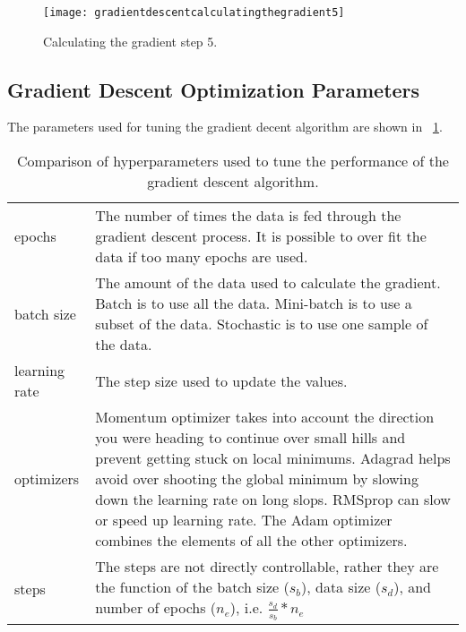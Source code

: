  	\begin{figure}[h]
		\centering
		\texttt{[image: gradientdescentcalculatingthegradient5]}
		\caption[Calculating the gradient step 5]{Calculating the gradient step 5.}
		\label{fig:gradientdescentcalculatingthegradient5}
	\end{figure}

	\subsection{Gradient Descent Optimization Parameters}
The parameters used for tuning the gradient decent algorithm are shown in \tablename~\ref{tab:gradientdescentoptimization}.

    \begin{table}
        \centering
        \caption[Hyperparameters of the gradient descent algorithm]{Comparison of hyperparameters used to tune the performance of the gradient descent algorithm.}
        \label{tab:gradientdescentoptimization}
		\begin{tabular}{|l|p{}|} \hline
				\tablecolumnheadervlinesone{Parameter} & \tablecolumnheadervlinestwo{Description} \\ \hline
				epochs &
	            The number of times the data is fed through the gradient descent process.  It is possible to over fit the data if too many epochs are used. \\ \hline
				batch size &
				The amount of the data used to calculate the gradient.  Batch is to use all the data.  Mini-batch is to use a subset of the data.  Stochastic is to use one sample of the data. \\ \hline
				learning rate &
				The step size used to update the values. \\ \hline
				optimizers &
				Momentum optimizer takes into account the direction you were heading to continue over small hills and prevent getting stuck on local minimums.  Adagrad helps avoid over shooting the global minimum by slowing down the learning rate on long slops.  RMSprop can slow or speed up learning rate.  The Adam optimizer combines the elements of all the other optimizers. \\ \hline
				steps &
				The steps are not directly controllable, rather they are the function of the batch size ($s_b$), data size ($s_d$), and number of epochs ($n_e$), i.e. $\frac{s_d}{s_b}*n_e$ \\ \hline
		\end{tabular}
	\end{table}

